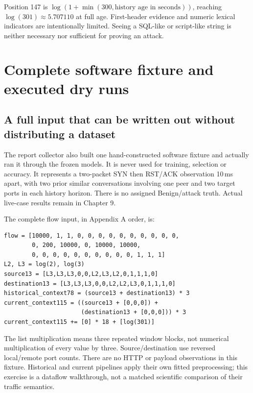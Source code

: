 \documentclass[11pt,a4paper,oneside]{report}
\begin{document}
Position 147 is $\log(1+\min(300,\text{history age in seconds}))$, reaching $\log(301)\approx5.707110$ at full age. First-header evidence and numeric lexical indicators are intentionally limited. Seeing a SQL-like or script-like string is neither necessary nor sufficient for proving an attack.

\chapter{Complete software fixture and executed dry runs}
\section{A full input that can be written out without distributing a dataset}
The report collector also built one hand-constructed software fixture and actually ran it through the frozen models. It is never used for training, selection or accuracy. It represents a two-packet SYN then RST/ACK observation 10\,ms apart, with two prior similar conversations involving one peer and two target ports in each history horizon. There is no assigned Benign/attack truth. Actual live-case results remain in Chapter 9.

The complete flow input, in Appendix A order, is:
\begin{lstlisting}
flow = [10000, 1, 1, 0, 0, 0, 0, 0, 0, 0, 0, 0, 0,
        0, 200, 10000, 0, 10000, 10000,
        0, 0, 0, 0, 0, 0, 0, 0, 0, 0, 1, 1, 1]
L2, L3 = log(2), log(3)
source13 = [L3,L3,L3,0,0,L2,L3,L2,0,1,1,1,0]
destination13 = [L3,L3,L3,0,0,L2,L2,L3,0,1,1,1,0]
historical_context78 = (source13 + destination13) * 3
current_context115 = ((source13 + [0,0,0]) +
                      (destination13 + [0,0,0])) * 3
current_context115 += [0] * 18 + [log(301)]
\end{lstlisting}
The list multiplication means three repeated window blocks, not numerical multiplication of every value by three. Source/destination use reversed local/remote port counts. There are no HTTP or payload observations in this fixture. Historical and current pipelines apply their own fitted preprocessing; this exercise is a dataflow walkthrough, not a matched scientific comparison of their traffic semantics.
\end{document}
